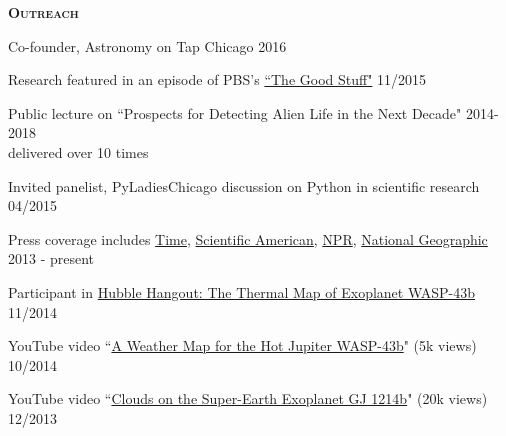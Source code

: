 \documentclass[12pt,letterpaper]{article}
\begin{document}
\textbf{\textsc{Outreach}} 
\begin{compactitem}[]
\item Co-founder, Astronomy on Tap Chicago \hfill 2016
\item Research featured in an episode of PBS's \href{https://www.youtube.com/watch?v=i4Hrmh6LJ0Q&index=2&list=PLsRLUurFnvvXTEbTjA1tvHhWmh6aKTgDw}{``The Good Stuff"} \hfill 11/2015
\item Public lecture on ``Prospects for Detecting Alien Life in the Next Decade" \hfill 2014-2018 \\
\hspace*{5 mm}delivered over 10 times\\ 
\item Invited panelist, PyLadiesChicago discussion on Python in scientific research \hfill 04/2015
\item Press coverage includes \href{http://science.time.com/2013/12/31/the-real-space-oddities-super-earths-and-jumbo-neptunes/}{Time}, \href{http://www.nature.com/scientificamerican/journal/v23/n3s/full/scientificamericanuniverse0814-4.html}{Scientific American}, \href{http://www.npr.org/2014/01/02/259222620/on-planet-gj1214-b-expect-exotic-cloud-cover}{NPR}, \href{http://news.nationalgeographic.com/news/2014/10/141014-space-hubble-planet-weather-science/?utm_source=Twitter&utm_medium=Social&utm_content=link_tw20141014news-hubbletele&utm_campaign=Content&sf5218387=1}{National Geographic} \hfill 2013 - present
\item Participant in \href{https://www.youtube.com/watch?v=n-oDqYCf3XY}{Hubble Hangout: The Thermal Map of Exoplanet WASP-43b} \hfill 11/2014
\item YouTube video ``\href{https://www.youtube.com/watch?v=tQZqAVhUk9E}{A Weather Map for the Hot Jupiter WASP-43b}" (5k views) \hfill 10/2014
\item YouTube video ``\href{https://www.youtube.com/watch?v=8x2DcgZiKTA}{Clouds on the Super-Earth Exoplanet GJ 1214b}" (20k views) \hfill 12/2013

\end{compactitem}
\end{document}
